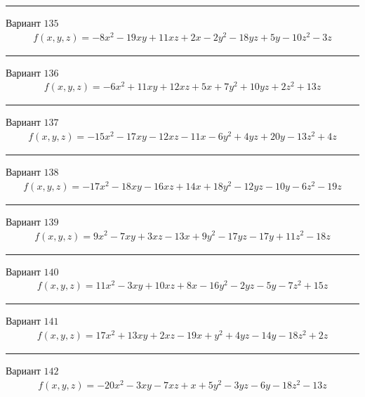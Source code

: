 \documentclass[11pt]{report}
\begin{document}
\begin{center}
\noindent\rule{8cm}{0.4pt}
\end{center}
Вариант $135$
\begin{align*}
    f(x, y, z) = - 8 x^{2} - 19 x y + 11 x z + 2 x - 2 y^{2} - 18 y z + 5 y - 10 z^{2} - 3 z
\end{align*}
\begin{center}
\noindent\rule{8cm}{0.4pt}
\end{center}
Вариант $136$
\begin{align*}
    f(x, y, z) = - 6 x^{2} + 11 x y + 12 x z + 5 x + 7 y^{2} + 10 y z + 2 z^{2} + 13 z
\end{align*}
\begin{center}
\noindent\rule{8cm}{0.4pt}
\end{center}
Вариант $137$
\begin{align*}
    f(x, y, z) = - 15 x^{2} - 17 x y - 12 x z - 11 x - 6 y^{2} + 4 y z + 20 y - 13 z^{2} + 4 z
\end{align*}
\begin{center}
\noindent\rule{8cm}{0.4pt}
\end{center}
Вариант $138$
\begin{align*}
    f(x, y, z) = - 17 x^{2} - 18 x y - 16 x z + 14 x + 18 y^{2} - 12 y z - 10 y - 6 z^{2} - 19 z
\end{align*}
\begin{center}
\noindent\rule{8cm}{0.4pt}
\end{center}
Вариант $139$
\begin{align*}
    f(x, y, z) = 9 x^{2} - 7 x y + 3 x z - 13 x + 9 y^{2} - 17 y z - 17 y + 11 z^{2} - 18 z
\end{align*}
\begin{center}
\noindent\rule{8cm}{0.4pt}
\end{center}
Вариант $140$
\begin{align*}
    f(x, y, z) = 11 x^{2} - 3 x y + 10 x z + 8 x - 16 y^{2} - 2 y z - 5 y - 7 z^{2} + 15 z
\end{align*}
\begin{center}
\noindent\rule{8cm}{0.4pt}
\end{center}
Вариант $141$
\begin{align*}
    f(x, y, z) = 17 x^{2} + 13 x y + 2 x z - 19 x + y^{2} + 4 y z - 14 y - 18 z^{2} + 2 z
\end{align*}
\begin{center}
\noindent\rule{8cm}{0.4pt}
\end{center}
Вариант $142$
\begin{align*}
    f(x, y, z) = - 20 x^{2} - 3 x y - 7 x z + x + 5 y^{2} - 3 y z - 6 y - 18 z^{2} - 13 z
\end{align*}
\end{document}
